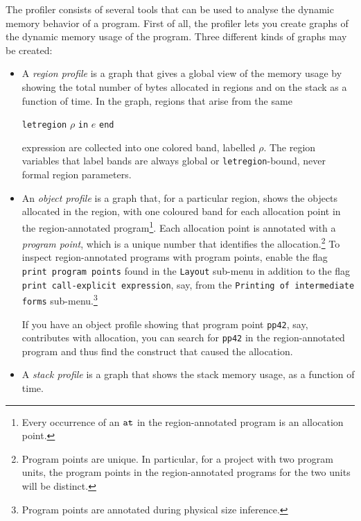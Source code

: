 \documentclass[12pt]{book}
\begin{document}
The profiler consists of several tools that can be used to analyse the
dynamic memory behavior of a program. First of all, the profiler lets
you create graphs of the dynamic memory usage of the program. Three
different kinds of graphs may be created:
\begin{itemize}
\item A 
  {\em region profile\/} is a graph that gives a global view of the
  memory usage by showing the total number of bytes allocated in
  regions and on the stack as a function of time. In the graph,
  regions that arise from the same
  \begin{center}
    \texttt{letregion} $\rho$ \texttt{in} $e$ \texttt{end}
  \end{center}
  expression are collected into one colored band, labelled $\rho$. The
  region variables that label bands are always global or {\tt letregion}-bound,
  never formal region parameters.
\item An 
  {\em object profile\/} is a graph that, for a particular region,
  shows the objects allocated in the region, with one coloured band
  for each allocation point in the region-annotated
  program\footnote{Every occurrence of an $\mathbin{\hbox{\tt at}}$ in the
    region-annotated program is an allocation point.}. Each allocation
  point is annotated with a
  {\em program point}, which is a unique number that identifies the
  allocation.\footnote{Program points are unique. In particular, for a
    project with two program units, the program points in the
    region-annotated programs for the two units will be distinct.}  To
  inspect region-annotated programs with program points, enable the
  flag {\tt print program points} found in the {\tt Layout} sub-menu
  in addition to the flag {\tt print call-explicit expression}, say,
  from the {\tt Printing of intermediate forms}
  sub-menu.\footnote{Program points are annotated during physical size
    inference.}
  
  If you have an object profile showing that program point
  \texttt{pp42}, say, contributes with allocation, you can search for
  \texttt{pp42} in the region-annotated program and thus find the
  construct that caused the allocation.
\item A 
  {\em stack profile\/} is a graph that shows the stack memory usage,
  as a function of time.
\end{itemize}
  
\end{document}
